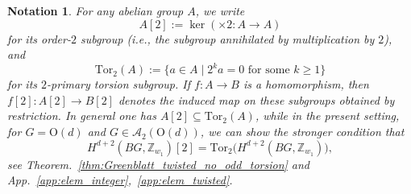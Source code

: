 \documentclass[aps,prx,reprint,superscriptaddress,twocolumn,amsmath,amssymb,amsfonts, nofootinbib]{revtex4-2}
\newcommand{\tor}{\text{Tor}}
\theoremstyle{apsstyle}
\newtheorem{notation}{Notation}
\begin{document}
{\begin{notation}
\label{notation:torsion}
For any abelian group $A$, we write
\begin{equation}
A[2]:=\ker(\times 2:A\to A)
\label{eq:order2}
\end{equation}
for its order-$2$ subgroup (i.e., the subgroup annihilated by multiplication by $2$), and
\begin{equation}
\tor_{2}(A):=\{a\in A\mid 2^{k}a=0\text{ for some }k\ge 1\}
\label{eq:2primarytorsion}
\end{equation}
for its $2$-primary torsion subgroup. If $f:A\to B$ is a homomorphism, then $f[2]:A[2]\to B[2]$ denotes the induced map on these subgroups obtained by restriction. In general one has $A[2]\subseteq \tor_{2}(A)$, while in the present setting, for $G=\mathrm{O}(d)$ and $G\in \mathcal A_{2}(\mathrm{O}(d))$, we can show the stronger condition that
\begin{equation}
H^{d+2}(BG,\mathbb Z_{w_{1}})[2]=
\tor_{2}\bigl(H^{d+2}(BG,\mathbb Z_{w_{1}})\bigr),
\label{eq:tor_equiv}
\end{equation}
see Theorem.~\ref{thm:Greenblatt_twisted_no_odd_torsion} and App.~\ref{app:elem_integer},~\ref{app:elem_twisted}.
\end{notation}

\bigskip 

}
\end{document}
